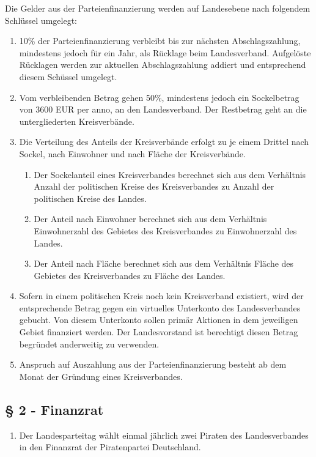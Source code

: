 Die Gelder aus der Parteienfinanzierung werden auf Landesebene nach folgendem
Schlüssel umgelegt:
\begin{enumerate}
\item 10\% der Parteienfinanzierung verbleibt bis zur nächsten Abschlagszahlung,
mindestens jedoch für ein Jahr, als Rücklage beim Landesverband. Aufgelöste
Rücklagen werden zur aktuellen Abschlagszahlung addiert und entsprechend diesem
Schüssel umgelegt.

\item Vom verbleibenden Betrag gehen 50\%, mindestens jedoch ein Sockelbetrag
von 3600 EUR per anno, an den Landesverband. Der Restbetrag geht an die
untergliederten Kreisverbände.

\item Die Verteilung des Anteils der Kreisverbände erfolgt zu je einem Drittel
nach Sockel, nach Einwohner und nach Fläche der Kreisverbände.
\begin{enumerate}
\item Der Sockelanteil eines Kreisverbandes berechnet sich aus dem Verhältnis
Anzahl der politischen Kreise des Kreisverbandes zu Anzahl der politischen
Kreise des Landes.

\item Der Anteil nach Einwohner berechnet sich aus dem Verhältnis Einwohnerzahl
des Gebietes des Kreisverbandes zu Einwohnerzahl des Landes.

\item Der Anteil nach Fläche berechnet sich aus dem Verhältnis Fläche des
Gebietes des Kreisverbandes zu Fläche des Landes.
\end{enumerate}

\item Sofern in einem politischen Kreis noch kein Kreisverband existiert, wird
der entsprechende Betrag gegen ein virtuelles Unterkonto des Landesverbandes
gebucht. Von diesem Unterkonto sollen primär Aktionen in dem jeweiligen Gebiet
finanziert werden. Der Landesvorstand ist berechtigt diesen Betrag begründet
anderweitig zu verwenden.

\item Anspruch auf Auszahlung aus der Parteienfinanzierung besteht ab dem Monat
der Gründung eines Kreisverbandes.
\end{enumerate}

\subsection{§ 2 - Finanzrat }
\begin{enumerate}
\item Der Landesparteitag wählt einmal jährlich zwei Piraten des Landesverbandes
in den Finanzrat der Piratenpartei Deutschland.
\end{enumerate}


